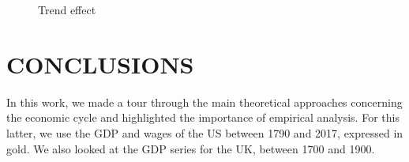 \documentclass[a4paper,10cpi]{article}
\begin{document}
	\begin{figure}[H]
		\centering
		\caption{Trend effect} \label{fig:espect_tendencias}
		
	\end{figure}
	
	\section{\uppercase{\textbf{\normalsize{Conclusions}}}}
	
	In this work, we made a tour through the main theoretical approaches concerning the economic cycle and highlighted the importance of empirical analysis. For this latter, we use the GDP and wages of the US between 1790 and 2017, expressed in gold. We also looked at the GDP series for the UK, between 1700 and 1900.
	
\end{document}
